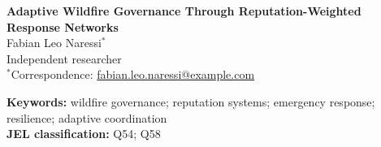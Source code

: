 \documentclass[11pt]{article}
\begin{document}
\begin{center}
{\Large \textbf{Adaptive Wildfire Governance Through Reputation-Weighted Response Networks}}\\[1em]

{\large Fabian Leo Naressi$^{*}$}\\
{\large Independent researcher}\\[0.5em]
{\small $^{*}$Correspondence: \href{mailto:fabian.leo.naressi@example.com}{fabian.leo.naressi@example.com}}
\end{center}

\vspace{1.5em}

\noindent \textbf{Keywords:} wildfire governance; reputation systems; emergency response; resilience; adaptive coordination\\
\textbf{JEL classification:} Q54; Q58

\vspace{1.5em}

\begin{abstract}
This paper proposes an adaptive governance framework for wildfire response based on reputation-weighted coordination among distributed response actors. The model combines reputation scoring, resource allocation, and a circulation-inspired incentive mechanism to improve the timeliness, resilience, and accountability of wildfire governance in high-risk landscapes. A lightweight simulation of representative fire-management agencies demonstrates how reputation-weighted decision influence can support faster consensus on resource deployment and more transparent post-event evaluation. The paper contributes a reproducible conceptual prototype that bridges wildfire governance, trust-weighted collaboration, and adaptive response design.
\end{abstract}
\end{document}
